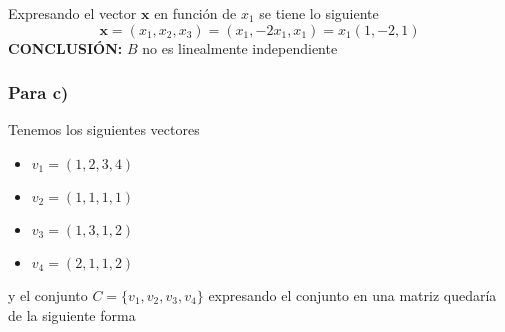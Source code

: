 Expresando el vector $\mathbf{x}$ en función de ${x}_{1}$ se tiene lo siguiente
$$
\mathbf{x} = ({x}_{1}, {x}_{2}, {x}_{3}) = ({x}_{1}, -2{x}_{1}, {x}_{1}) = {x}_{1}(1, -2, 1)
$$
\textbf{CONCLUSIÓN:} $B$ no es linealmente independiente

\subsubsection{Para c)}
Tenemos los siguientes vectores
\begin{itemize}
    \item ${v}_{1} = (1,2,3,4)$
    \item ${v}_{2} = (1,1,1,1)$
    \item ${v}_{3} = (1,3,1,2)$
    \item ${v}_{4} = (2,1,1,2)$ 
\end{itemize}
y el conjunto $C=\{ {v}_{1}, {v}_{2}, {v}_{3}, {v}_{4} \}$ expresando el conjunto en una matriz quedaría de la siguiente forma

